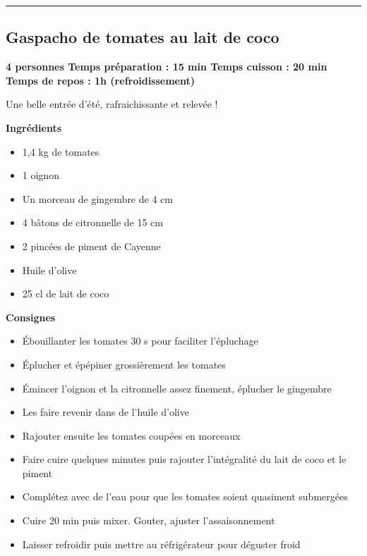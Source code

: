 \documentclass[]{book}
\providecommand{\tightlist}{%
  \setlength{\itemsep}{0pt}\setlength{\parskip}{0pt}}
\begin{document}
\begin{center}\rule{0.5\linewidth}{0.5pt}\end{center}

\hypertarget{gaspacho-de-tomates-au-lait-de-coco}{%
\subsection*{\texorpdfstring{{Gaspacho de tomates au lait de coco}}{Gaspacho de tomates au lait de coco}}\label{gaspacho-de-tomates-au-lait-de-coco}}

\begin{salebox}
\textbf{4 personnes \textbar{} Temps préparation : 15 min \textbar{}
Temps cuisson : 20 min \textbar{} Temps de repos : 1h (refroidissement)}

Une belle entrée d'été, rafraichissante et relevée !
\end{salebox}

\textbf{Ingrédients}

\begin{itemize}
\tightlist
\item
  1,4 kg de tomates
\item
  1 oignon
\item
  Un morceau de gingembre de 4 cm
\item
  4 bâtons de citronnelle de 15 cm
\item
  2 pincées de piment de Cayenne
\item
  Huile d'olive
\item
  25 cl de lait de coco
\end{itemize}

\textbf{Consignes}

\begin{itemize}
\tightlist
\item
  Ébouillanter les tomates 30 s pour faciliter l'épluchage
\item
  Éplucher et épépiner grossièrement les tomates
\item
  Émincer l'oignon et la citronnelle assez finement, éplucher le gingembre
\item
  Les faire revenir dans de l'huile d'olive
\item
  Rajouter ensuite les tomates coupées en morceaux
\item
  Faire cuire quelques minutes puis rajouter l'intégralité du lait de coco et le piment
\item
  Complétez avec de l'eau pour que les tomates soient quasiment submergées
\item
  Cuire 20 min puis mixer. Gouter, ajuster l'assaisonnement
\item
  Laisser refroidir puis mettre au réfrigérateur pour déguster froid
\end{itemize}
\end{document}
